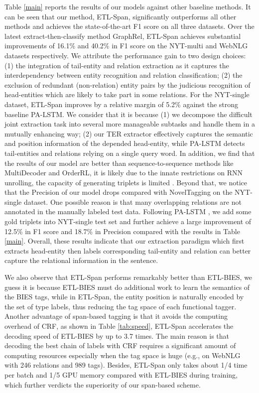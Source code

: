 \documentclass{ecai}
\begin{document}
Table \ref{main} reports the results of our models against other baseline methods. 
It can be seen that our method, ETL-Span, significantly outperforms all other methods and achieves the state-of-the-art F1 score on all three datasets.
Over the latest extract-then-classify method GraphRel, ETL-Span achieves substantial improvements of 16.1\% and 40.2\% in F1 score on the NYT-multi and WebNLG datasets respectively. 
We attribute the performance gain to two design choices:  
(1) the integration of tail-entity and relation extraction as it captures the interdependency between entity recognition and relation classification; 
(2) the exclusion of redundant (non-relation) entity pairs by the judicious recognition of head-entities which are likely to take part in some relations.
For the NYT-single dataset, ETL-Span improves by a relative margin of 5.2\% against the strong baseline PA-LSTM. 
We consider that it is because
(1) we decompose the difficult joint extraction task into several more manageable subtasks and handle them in a mutually enhancing way;
(2) our TER extractor effectively captures the semantic and position information of the depended head-entity, while PA-LSTM detects tail-entities and relations relying on a single query word.
In addition, we find that the results of our model are better than sequence-to-sequence methods like MultiDecoder and OrderRL, it is likely due to the innate restrictions on RNN unrolling, the capacity of generating triplets is limited \cite{fu-etal-2019-graphrel}.
Beyond that, we notice that the Precision of our model drops compared with NovelTagging on the NYT-single dataset. 
One possible reason is that many overlapping relations are not annotated in the manually labeled test data.
Following PA-LSTM \cite{dai2019joint}, we add some gold triplets into NYT-single test set and further achieve a large improvement of 12.5\% in F1 score and 18.7\% in Precision compared with the results in Table \ref{main}.
Overall, these results indicate that our extraction paradigm which first extracts head-entity then labels corresponding tail-entity and relation can better capture the relational information in the sentence.


We also observe that ETL-Span performs remarkably better than ETL-BIES, we guess it is because ETL-BIES must do additional work to learn the semantics of the BIES tags, while in ETL-Span, the entity position is naturally encoded by the set of type labels, thus reducing the tag space of each functional tagger.
Another advantage of span-based tagging is that it avoids the computing overhead of CRF, as shown in Table \ref{tab:speed}, ETL-Span accelerates the decoding speed of ETL-BIES by up to 3.7 times.
  The main reason is that decoding the best chain of labels with CRF requires a significant amount of computing resources especially when the tag space is huge (e.g., on WebNLG with 246 relations and 989 tags). 
Besides, ETL-Span only takes about 1/4 time per batch and 1/5 GPU memory compared with ETL-BIES during training, which further verdicts the superiority of our span-based scheme.
\end{document}

